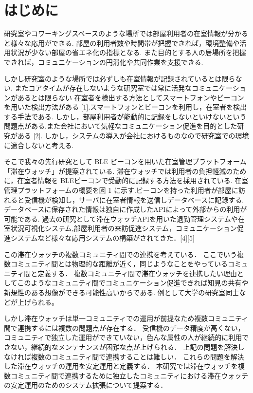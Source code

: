 \thispagestyle{myheadings}

\section{はじめに}
\label{sec:intro}
研究室やコワーキングスペースのような場所では部屋利用者の在室情報が分かると様々な応用ができる.
部屋の利用者数や時間帯が把握できれば，環境整備や活用状況が少ない部屋の省エネ化の指標となる.
また目的とする人の居場所を把握できれば，コミュニケーションの円滑化や共同作業を支援できる.

しかし研究室のような場所では必ずしも在室情報が記録されているとは限らない.
またコアタイムが存在しないような研究室では常に活発なコミュニケーションがあるとは限らない
在室者を検出する方法としてスマートフォンやビーコンを用いた検出方法がある [1].スマートフォンとビーコンを利用し，在室者を検出する手法である.
しかし，部屋利用者が能動的に記録をしないといけないという問題点がある.また会社において気軽なコミュニケーション促進を目的とした研究がある [2].
しかし，システムの導入が会社におけるものなので研究室での環境に適合しないと考える.

そこで我々の先行研究として BLE ビーコンを用いた在室管理プラットフォーム「滞在ウォッチ」が提案されている.
滞在ウォッチでは利用者の負担軽減のために，在室者情報を BLEビーコンで受動的に記録する方法を採用されている.
在室管理プラットフォームの概要を図 1 に示す.ビーコンを持った利用者が部屋に訪れると受信機が検知し，サーバに在室者情報を送信しデータベースに記録する.
データベースに保存された情報は独自に作成したAPIによって外部からの利用が可能である.
過去の研究として滞在ウォッチAPIを用いた退勤管理システムや在室状況可視化システム,部屋利用者の来訪促進システム，コミュニケーション促進システムなど様々な応用システムの構築がされてきた．[4][5]

この滞在ウォッチの複数コミュニティ間での連携を考えている．
ここでいう複数コミュニティ間とは物理的な距離が近く，同じようなことをやっているコミュニティ間と定義する．
複数コミュニティ間で滞在ウォッチを連携したい理由としてこのようなコミュニティ間でコミュニケーション促進できれば知見の共有や新規性のある想像ができる可能性高いからである.
例として大学の研究室同士などが上げられる。

しかし滞在ウォッチは単一コミュニティでの運用が前提なため複数コミュニティ間で連携するには複数の問題点が存在する．
受信機のデータ精度が高くない，コミュニティで独立した運用ができていない，色んな属性の人が継続的に利用できない，継続的なメンテナンスが困難な点が上げられる．
上記の問題を解決しなければ複数のコミュニティ間で連携することは難しい．
これらの問題を解決した滞在ウォッチの運用を安定運用と定義する．
本研究では滞在ウォッチを複数コミュニティ間で連携するために独立したコミュニティにおける滞在ウォッチの安定運用のためのシステム拡張について提案する．